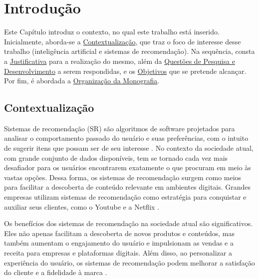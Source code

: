 \chapter[Introdução]{Introdução}\label{chap:intro}

Este Capítulo introduz o contexto, no qual este trabalho está inserido. Inicialmente, aborda-se a 
\hyperref[sec:contextualizacao]{Contextualização}, que traz o foco de interesse desse trabalho (inteligência 
artificial e sistemas de recomendação). Na sequência, consta a \hyperref[sec:justificativa]{Justificativa}
para a realização do mesmo, além da \hyperref[sec:questaopesquisa]{Questões de Pesquisa e Desenvolvimento} a serem respondidas, e os
\hyperref[sec:objetivos]{Objetivos} que se pretende alcançar. Por fim, é abordada a 
\hyperref[sec:organizacao]{Organização da Monografia}. 

\section{Contextualização}\label{sec:contextualizacao}
Sistemas de recomendação (SR) são algoritmos de software projetados para analisar o comportamento passado do usuário 
e suas preferências, com o intuito de sugerir itens que possam ser de seu interesse \cite{Subramaniam}. No contexto
da sociedade atual, com grande conjunto de dados disponíveis, tem se tornado cada vez mais desafiador para os usuários encontrarem 
exatamente o que procuram em meio às vastas opções. Dessa forma, os sistemas de recomendação surgem como
meios para facilitar a descoberta de conteúdo relevante em ambientes digitais. Grandes empresas utilizam 
sistemas de recomendação como estratégia para conquistar e auxiliar seus clientes, como o Youtube e a Netflix \cite{Zhang_Survey}.

Os benefícios dos sistemas de recomendação na sociedade atual são significativos. Eles não apenas facilitam a descoberta
de novos produtos e conteúdos, mas também aumentam o engajamento do usuário e impulsionam as vendas e a receita para
empresas e plataformas digitais. Além disso, ao personalizar a experiência do usuário, os sistemas de recomendação podem
melhorar a satisfação do cliente e a fidelidade à marca \cite{Gunawardana2022}.

